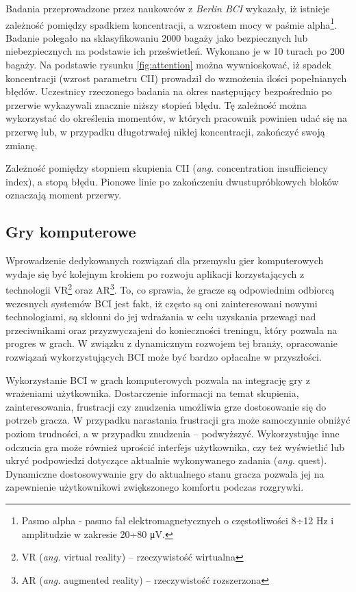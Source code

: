 \documentclass[skorowidz,skroty]{dyplomWEZUT}
\begin{document}
Badania przeprowadzone przez naukowców z \textit{Berlin BCI} wykazały, iż istnieje zależność pomiędzy spadkiem koncentracji, a wzrostem mocy w paśmie alpha\footnote{Pasmo alpha - pasmo fal elektromagnetycznych o częstotliwości 8÷12 Hz i amplitudzie w zakresie 20÷80 μV\cite[str. 17]{bci_handbook}.}\cite{berlinbci_attention}. Badanie polegało na sklasyfikowaniu 2000 bagaży jako bezpiecznych lub niebezpiecznych na podstawie ich prześwietleń. Wykonano je w 10 turach po 200 bagaży. Na podstawie rysunku \vref{fig:attention} można wywnioskować, iż spadek koncentracji (wzrost parametru CII) prowadził do wzmożenia ilości popełnianych błędów. Uczestnicy rzeczonego badania na okres następujący bezpośrednio po przerwie wykazywali znacznie niższy stopień błędu. Tę zależność można wykorzystać do określenia momentów, w których pracownik powinien udać się na przerwę lub, w przypadku długotrwałej nikłej koncentracji, zakończyć swoją zmianę.

{Zależność pomiędzy stopniem skupienia CII (\textit{ang.} concentration insufficiency index), a stopą błędu. Pionowe linie po zakończeniu dwustupróbkowych bloków oznaczają moment przerwy.\label{fig:attention}}
{\cite{berlinbci_attention}}

\subsection{Gry komputerowe}
Wprowadzenie dedykowanych rozwiązań dla przemysłu gier komputerowych wydaje się być kolejnym krokiem po rozwoju aplikacji korzystających z technologii VR\footnote{VR (\textit{ang.} virtual reality) -- rzeczywistość wirtualna} oraz AR\footnote{AR (\textit{ang.} augmented reality) -- rzeczywistość rozszerzona}. To, co sprawia, że gracze są odpowiednim odbiorcą wczesnych systemów BCI jest fakt, iż często są oni zainteresowani nowymi technologiami, są skłonni do jej wdrażania w celu uzyskania przewagi nad przeciwnikami oraz przyzwyczajeni do konieczności treningu, który pozwala na progres w grach\cite{bci_games_survey}. W związku z dynamicznym rozwojem tej branży, opracowanie rozwiązań wykorzystujących BCI może być bardzo opłacalne w przyszłości.

Wykorzystanie BCI w grach komputerowych pozwala na integrację gry z wrażeniami użytkownika. Dostarczenie informacji na temat skupienia, zainteresowania, frustracji czy znudzenia umożliwia grze dostosowanie się do potrzeb gracza. W przypadku narastania frustracji gra może samoczynnie obniżyć poziom trudności, a w przypadku znudzenia -- podwyższyć. Wykorzystując inne odczucia gra może również uprościć interfejs użytkownika, czy też wyświetlić lub ukryć podpowiedzi dotyczące aktualnie wykonywanego zadania (\textit{ang.} quest). Dynamiczne dostosowywanie gry do aktualnego stanu gracza pozwala jej na zapewnienie użytkownikowi zwiększonego komfortu podczas rozgrywki.
\end{document}
